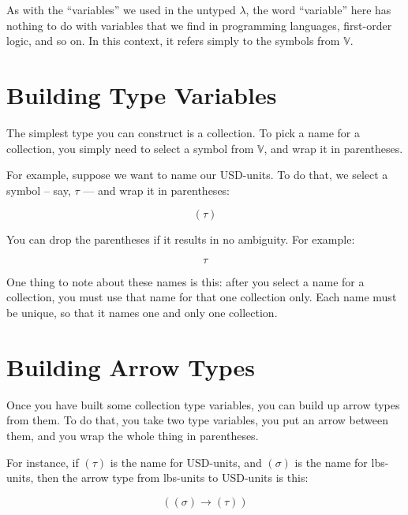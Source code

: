 \documentclass{book}
\numberwithin{equation}{chapter}
\begin{document}
\noindent
As with the ``variables'' we used in the untyped $\lambda$, the word ``variable'' here has nothing to do with variables that we find in programming languages, first-order logic, and so on. In this context, it refers simply to the symbols from $\mathbb{V}$.


\section{Building Type Variables}

The simplest type you can construct is a collection. To pick a name for a collection, you simply need to select a symbol from $\mathbb{V}$, and wrap it in parentheses. 

For example, suppose we want to name our USD-units. To do that, we select a symbol -- say, $\tau$ --- and wrap it in parentheses:

\begin{equation}
(\tau)
\end{equation}

\noindent
You can drop the parentheses if it results in no ambiguity. For example:

\begin{equation}
\tau
\end{equation}

\noindent
One thing to note about these names is this: after you select a name for a collection, you must use that name for that one collection only. Each name must be unique, so that it names one and only one collection.


\section{Building Arrow Types}

Once you have built some collection type variables, you can build up arrow types from them. To do that,
you take two type variables, you put an arrow between them, and you wrap the whole thing in parentheses.

For instance, if $(\tau)$ is the name for USD-units, and $(\sigma)$ is the name for lbs-units, then the arrow type from lbs-units to USD-units is this: 

\begin{equation}
((\sigma) \rightarrow (\tau))
\end{equation}
\end{document}
